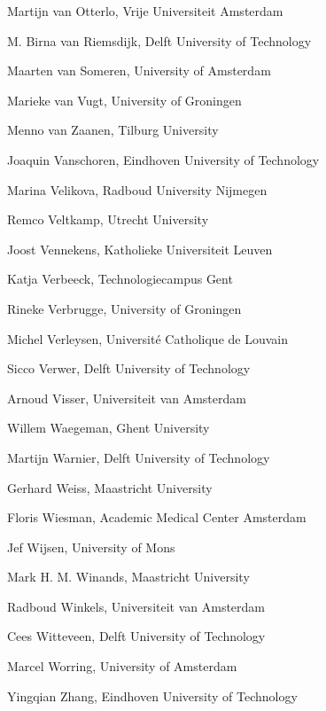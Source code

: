\documentclass[a4paper,oneside]{book}
\makeatletter
\newcommand\MakePlainPagestyleEmpty{\let\ps@plain\ps@empty}
\makeatother
\begin{document}
\begin{compactitem}[]
		\item[] Martijn van Otterlo, Vrije Universiteit Amsterdam
		\item[] M. Birna van Riemsdijk, Delft University of Technology
		\item[] Maarten van Someren, University of Amsterdam
		\item[] Marieke van Vugt, University of Groningen
		\item[] Menno van Zaanen, Tilburg University
		\item[] Joaquin Vanschoren, Eindhoven University of Technology
		\item[] Marina Velikova, Radboud University Nijmegen
		\item[] Remco Veltkamp, Utrecht University
		\item[] Joost Vennekens, Katholieke Universiteit Leuven
		\item[] Katja Verbeeck, Technologiecampus Gent
		\item[] Rineke Verbrugge, University of Groningen
		\item[] Michel Verleysen, Universit\'e Catholique de Louvain
		\item[] Sicco Verwer, Delft University of Technology
		\item[] Arnoud Visser, Universiteit van Amsterdam
		\item[] Willem Waegeman, Ghent University
		\item[] Martijn Warnier, Delft University of Technology
		\item[] Gerhard Weiss, Maastricht University
		\item[] Floris Wiesman, Academic Medical Center Amsterdam
		\item[] Jef Wijsen, University of Mons
		\item[] Mark H. M. Winands, Maastricht University
		\item[] Radboud Winkels, Universiteit van Amsterdam
		\item[] Cees Witteveen, Delft University of Technology
		\item[] Marcel Worring, University of Amsterdam
		\item[] Yingqian Zhang, Eindhoven University of Technology
	\end{compactitem}



\tableofcontents

\mainmatter
\MakePlainPagestyleEmpty



\printindex[authors]


\end{document}
